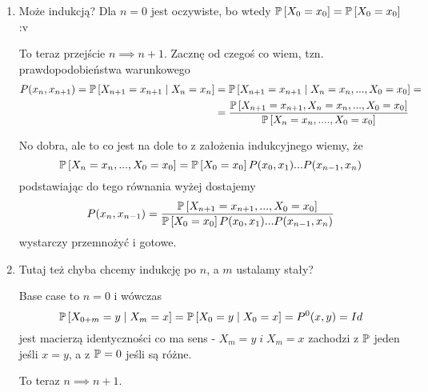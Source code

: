 \begin{solution}
  \begin{enumerate}
    \item Może indukcją? Dla $n=0$ jest oczywiste, bo wtedy $\prob{X_0=x_0}=\prob{X_0=x_0}$ :v

      To teraz przejście $n\implies n+1$. Zacznę od czegoś co wiem, tzn. prawdopodobieństwa warunkowego
      \begin{align*}
        P(x_n, x_{n+1})=\prob{X_{n+1}=x_{n+1}}{X_n=x_n}&=\prob{X_{n+1}=x_{n+1}}{X_n=x_n,...,X_0=x_0}=\\ 
                                                       &=\frac{\prob{X_{n+1}=x_{n+1}, X_n=x_n,...,X_0=x_0}}{\prob{X_n=x_n,....,X_0=x_0}}
      \end{align*}

      No dobra, ale to co jest na dole to z założenia indukcyjnego wiemy, że 
      $$\prob{X_n=x_n,...,X_0=x_0}=\prob{X_0=x_0}P(x_0, x_1)...P(x_{n-1},x_n)$$
      podstawiając do tego równania wyżej dostajemy
      $$P(x_n,x_{n-1})=\frac{\prob{X_{n+1}=x_{n+1},...,X_0=x_0}}{\prob{X_0=x_0}P(x_0,x_1)...P(x_{n-1},x_n)}$$
      wystarczy przemnożyć i gotowe.
    \item Tutaj też chyba chcemy indukcję po $n$, a $m$ ustalamy stały?

      Base case to $n=0$ i wówczas
      $$\prob{X_{0+m}=y}{X_m=x}=\prob{X_0=y}{X_0=x}=P^0(x, y)=Id$$
      jest macierzą identyczności co ma sens - $X_m=y\;i\; X_m=x$ zachodzi z $\prob$ jeden jeśli $x=y$, a z $\prob=0$ jeśli są różne.

      To teraz $n\implies n+1$.



\end{enumerate}
\end{solution}

